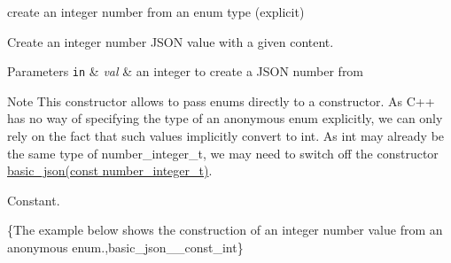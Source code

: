 create an integer number from an enum type (explicit) 

Create an integer number J\-S\-O\-N value with a given content.


\begin{DoxyParams}[1]{Parameters}
\mbox{\tt in}  & {\em val} & an integer to create a J\-S\-O\-N number from\\
\hline
\end{DoxyParams}
\begin{DoxyNote}{Note}
This constructor allows to pass enums directly to a constructor. As C++ has no way of specifying the type of an anonymous enum explicitly, we can only rely on the fact that such values implicitly convert to int. As int may already be the same type of number\-\_\-integer\-\_\-t, we may need to switch off the constructor \hyperlink{classnlohmann_1_1basic__json_a0d838bc7ffca6017f51167e0a8ffd9b6}{basic\-\_\-json(const number\-\_\-integer\-\_\-t)}.
\end{DoxyNote}
Constant.

\{The example below shows the construction of an integer number value from an anonymous enum.,basic\-\_\-json\-\_\-\-\_\-const\-\_\-int\}

